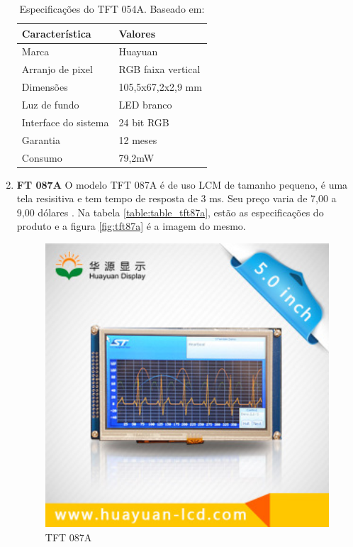 \begin{enumerate}
\begin{table}[ht]
\caption{Especificações do TFT 054A. Baseado em: \cite{tft}}
\centering
\begin{tabular}{| l |  p{10cm} |}
\hline
Característica & Valores \\
\hline
Marca & Huayuan \\
\hline
Arranjo de pixel & RGB faixa vertical \\
\hline
Dimensões & 105,5x67,2x2,9 mm \\
\hline
Luz de fundo & LED branco \\
\hline
Interface do sistema & 24 bit RGB \\
\hline
Garantia & 12 meses \\
\hline
Consumo & 79,2mW \\
\hline
\end{tabular}
\label{table:table_tela_resistiva}
\end{table}


\item \textbf{FT 087A}
O modelo TFT 087A é de uso LCM de tamanho pequeno, é uma tela resisitiva
e tem tempo de resposta de 3 ms. Seu preço varia de 7,00 a 9,00 dólares
\cite{monitor_lcd}.  Na tabela \ref{table:table_tft87a}, estão as especificações
do produto e a figura \ref{fig:tft87a} é a imagem do mesmo.


\begin{figure}[h]
  \centering
  \includegraphics[width=400px, scale=1]{figuras/tela_87a}
  \caption{TFT 087A \cite{monitor_lcd}}
\label{fig:tela_87a}
\end{figure}


\end{enumerate}

